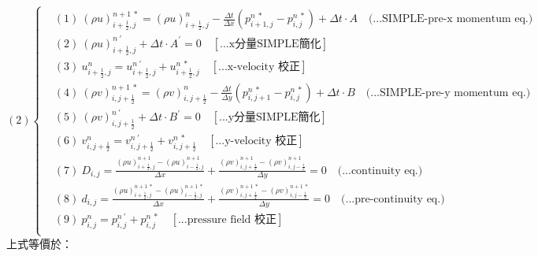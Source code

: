 \documentclass[12pt]{article}
\begin{document}
\begin{equation}
(2)
\left\{
\begin{aligned}
    &(1)\ (\rho u)_{i+\frac{1}{2},j}^{n+1\ *} = (\rho u)_{i+\frac{1}{2},j}^{n} - \frac{\Delta t}{\Delta x}(p_{i+1,j}^{n\ *} - p_{i,j}^{n\ *}) + \Delta t \cdot A  \quad \text{(...SIMPLE-pre-x momentum eq.)}\\[1.5ex]
    &(2)\ (\rho u)_{i+\frac{1}{2},j}^{n\ \prime} + \Delta t \cdot A^{\prime} = 0\quad \left[\text{...x分量SIMPLE簡化}\right]\\[1.5ex]
    &(3)\ u_{i+\frac{1}{2},j}^{n} = u_{i+\frac{1}{2},j}^{n\ \prime} + u_{i+\frac{1}{2},j}^{n\ *}  \quad \left[\text{...x-velocity 校正}\right]\\[1.5ex]
    &(4)\ (\rho v)_{i,j+\frac{1}{2}}^{n+1\ *} = (\rho v)_{i,j+\frac{1}{2}}^{n} - \frac{\Delta t}{\Delta y}(p_{i,j+1}^{n\ *} - p_{i,j}^{n\ *}) + \Delta t \cdot B  \quad \text{(...SIMPLE-pre-y momentum eq.)}\\[1.5ex]
    &(5)\ (\rho v)_{i,j+\frac{1}{2}}^{n\ \prime} + \Delta t \cdot B^{\prime} = 0 \quad\left[\text{...y分量SIMPLE簡化}\right]\\[1.5ex]
    &(6)\ v_{i,j+\frac{1}{2}}^{n} = v_{i,j+\frac{1}{2}}^{n\ \prime} + v_{i,j+\frac{1}{2}}^{n\ *} \quad \left[\text{...y-velocity 校正}\right]\\[1.5ex]
    &(7)\ D_{i,j} = \frac{(\rho u)_{i+\frac{1}{2},j}^{n+1} - (\rho u)_{i-\frac{1}{2},j}^{n+1}}{\Delta x} + \frac{(\rho v)_{i,j+\frac{1}{2}}^{n+1} - (\rho v)_{i,j-\frac{1}{2}}^{n+1}}{\Delta y} = 0 \quad \text{(...continuity eq.)}\\[1.5ex]
    &(8)\ d_{i,j} = \frac{(\rho u)_{i+\frac{1}{2},j}^{n+1\ *} - (\rho u)_{i-\frac{1}{2},j}^{n+1\ *}}{\Delta x} + \frac{(\rho v)_{i,j+\frac{1}{2}}^{n+1\ *} - (\rho v)_{i,j-\frac{1}{2}}^{n+1\ *}}{\Delta y} = 0 \quad \text{(...pre-continuity eq.)}\\[1.5ex]
    &(9)\ p_{i,j}^{n} = p_{i,j}^{n\ \prime} + p_{i,j}^{n\ *} \quad\left[\text{...pressure field 校正}\right]\\[1.5ex]
\end{aligned}
\right.
\end{equation}
\noindent 上式等價於：\\
\end{document}
